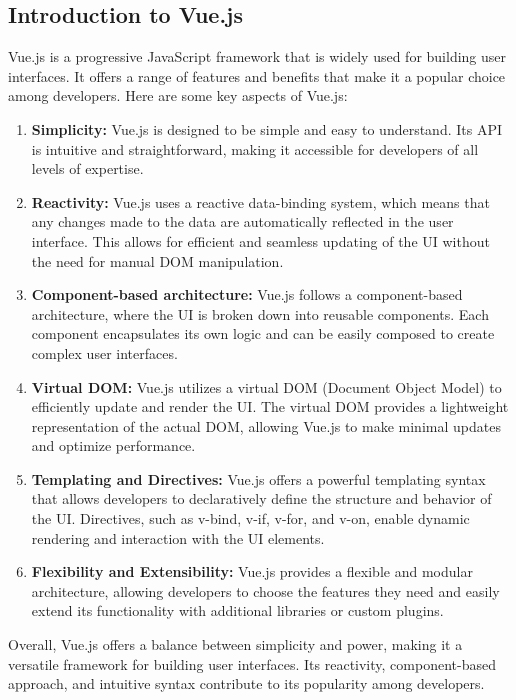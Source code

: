 \subsection{Introduction to Vue.js}
Vue.js is a progressive JavaScript framework that is widely used for building user interfaces. It offers a range of features and benefits that make it a popular choice among developers. Here are some key aspects of Vue.js:
\begin{enumerate}
\item \textbf{Simplicity:} Vue.js is designed to be simple and easy to understand. Its API is intuitive and straightforward, making it accessible for developers of all levels of expertise.

\item \textbf{Reactivity:} Vue.js uses a reactive data-binding system, which means that any changes made to the data are automatically reflected in the user interface. This allows for efficient and seamless updating of the UI without the need for manual DOM manipulation.

\item \textbf{Component-based architecture:} Vue.js follows a component-based architecture, where the UI is broken down into reusable components. Each component encapsulates its own logic and can be easily composed to create complex user interfaces.

\item \textbf{Virtual DOM:} Vue.js utilizes a virtual DOM (Document Object Model) to efficiently update and render the UI. The virtual DOM provides a lightweight representation of the actual DOM, allowing Vue.js to make minimal updates and optimize performance.

\item \textbf{Templating and Directives:} Vue.js offers a powerful templating syntax that allows developers to declaratively define the structure and behavior of the UI. Directives, such as v-bind, v-if, v-for, and v-on, enable dynamic rendering and interaction with the UI elements.

\item \textbf{Flexibility and Extensibility:} Vue.js provides a flexible and modular architecture, allowing developers to choose the features they need and easily extend its functionality with additional libraries or custom plugins.
\end{enumerate}
Overall, Vue.js offers a balance between simplicity and power, making it a versatile framework for building user interfaces. Its reactivity, component-based approach, and intuitive syntax contribute to its popularity among developers.
